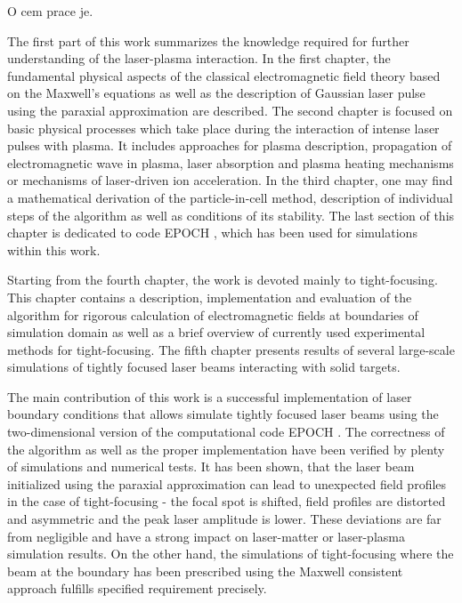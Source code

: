 O cem prace je.

The first part of this work summarizes the knowledge required for further understanding of the laser-plasma interaction. In the first chapter, the fundamental physical aspects of the classical electromagnetic field theory \cite{Stratton2007, Jackson2005, Feynman1963, Thide2011} based on the Maxwell's equations as well as the description of Gaussian laser pulse using the paraxial approximation \cite{Born2013} are described. The second chapter is focused on basic physical processes which take place during the interaction of intense laser pulses with plasma. It includes approaches for plasma description, propagation of electromagnetic wave in plasma, laser absorption and plasma heating mechanisms or mechanisms of laser-driven ion acceleration. In the third chapter, one may find a mathematical derivation of the particle-in-cell method, description of individual steps of the algorithm as well as conditions of its stability. The last section of this chapter is dedicated to code EPOCH \cite{bennett}, which has been used for simulations within this work. 

Starting from the fourth chapter, the work is devoted mainly to tight-focusing. This chapter contains a description, implementation and evaluation of the algorithm for rigorous calculation of electromagnetic fields at boundaries of simulation domain \cite{Thiele2016} as well as a brief overview of currently used experimental methods for tight-focusing. The fifth chapter presents results of several large-scale simulations of tightly focused laser beams interacting with solid targets.

The main contribution of this work is a successful implementation of laser boundary conditions that allows simulate tightly focused laser beams using the two-dimensional version of the computational code EPOCH \cite{bennett}. The correctness of the algorithm as well as the proper implementation have been verified by plenty of simulations and numerical tests. It has been shown, that the laser beam initialized using the paraxial approximation can lead to unexpected field profiles in the case of tight-focusing - the focal spot is shifted, field profiles are distorted and asymmetric and the peak laser amplitude is lower. These deviations are far from negligible and have a strong impact on laser-matter or laser-plasma simulation results. On the other hand, the simulations of tight-focusing where the beam at the boundary has been prescribed using the Maxwell consistent approach \cite{Thiele2016} fulfills specified requirement precisely.

